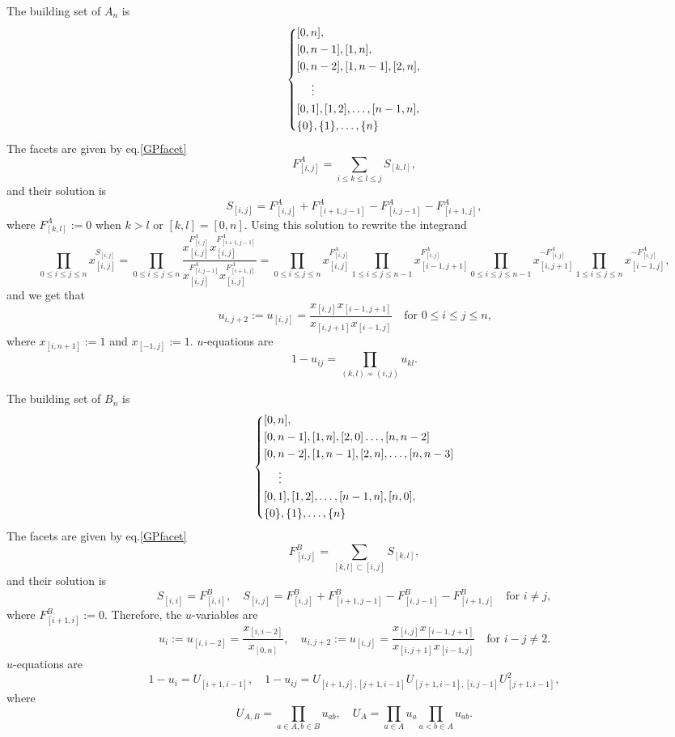 \documentclass[hidelinks,12pt]{article}
\begin{document}
The building set of $A_n$ is
\[\left\{
\begin{aligned}
	&[0,n],\\
	&[0,n-1],[1,n],\\
	&[0,n-2],[1,n-1],[2,n],\\
	&\hspace{3ex}\vdots\\
	&[0,1],[1,2],\dots,[n-1,n],\\
	&\{0\},\{1\},\dots,\{n\}
\end{aligned}\right.
\]
The facets are given by eq.\eqref{GPfacet}
\[
F^A_{[i,j]}=\sum_{i\leq k\leq l\leq j}S_{[k,l]},
\]
and their solution is 
\[
S_{[i,j]}=F^A_{[i,j]}+F^A_{[i+1,j-1]}-F^A_{[i,j-1]}-F^A_{[i+1,j]},
\]
where $F^A_{[k,l]}:=0$ when $k>l$ or $[k,l]=[0,n]$. Using this solution to rewrite the integrand
\[
\prod_{0\leq i\leq j\leq n}x_{[i,j]}^{S_{[i,j]}}
=\prod_{0\leq i\leq j\leq n}\frac{x_{[i,j]}^{F^A_{[i,j]}}x_{[i,j]}^{F^A_{[i+1,j-1]}}}{x_{[i,j]}^{F^A_{[i,j-1]}}x_{[i,j]}^{F^A_{[i+1,j]}}}
=
\prod_{0\leq i\leq j\leq n}x_{[i,j]}^{F^A_{[i,j]}}
\prod_{1\leq i\leq j\leq n-1}x_{[i-1,j+1]}^{F^A_{[i,j]}}
\prod_{0\leq i\leq j\leq n-1}x_{[i,j+1]}^{-F^A_{[i,j]}}
\prod_{1\leq i\leq j\leq n}x_{[i-1,j]}^{-F^A_{[i,j]}},
\]
and we get that
\[
u_{i,j+2}:=u_{[i,j]}=\frac{x_{[i,j]}x_{[i-1,j+1]}}{x_{[i,j+1]}x_{[i-1,j]}} \quad \text{for $0\leq i\leq j\leq n$,}
\]
where $x_{[i,n+1]}:=1$ and  $x_{[-1,j]}:=1$. $u$-equations are
\[
1-u_{ij}=\prod_{(k,l)\not\sim (i,j)}u_{kl}.
\]

The building set of $B_n$ is
\[\left\{
\begin{aligned}
	&[0,n],\\
	&[0,n-1],[1,n],[2,0]\dots,[n,n-2]\\
	&[0,n-2],[1,n-1],[2,n],\dots,[n,n-3]\\
	&\hspace{3ex}\vdots\\
	&[0,1],[1,2],\dots,[n-1,n],[n,0],\\
	&\{0\},\{1\},\dots,\{n\}
\end{aligned}\right.
\]
The facets are given by eq.\eqref{GPfacet}
\[
F^B_{[i,j]}=\sum_{[k,l]\subset [i,j]}S_{[k,l]},
\]
and their solution is 
\[
S_{[i,i]}=F^B_{[i,i]},\quad S_{[i,j]}=F^B_{[i,j]}+F^B_{[i+1,j-1]}-F^B_{[i,j-1]}-F^B_{[i+1,j]}\quad \text{for $i\neq j$},
\]
where $F^B_{[i+1,i]}:=0$. Therefore, the $u$-variables are
\[
u_i:=u_{[i,i-2]}=\frac{x_{[i,i-2]}}{x_{[0,n]}},\quad 
u_{i,j+2}:=u_{[i,j]}=\frac{x_{[i,j]}x_{[i-1,j+1]}}{x_{[i,j+1]}x_{[i-1,j]}}
\quad \text{for $i-j\neq 2$}.
\]
$u$-equations are
\[
1-u_i=U_{[i+1,i-1]},\quad 
1-u_{ij}=U_{[i+1,j],[j+1,i-1]}U_{[j+1,i-1],[i,j-1]}U^2_{[j+1,i-1]},
\]
where 
\[
U_{A,B}=\prod_{a\in A,b\in B}u_{ab},\quad 
U_A=\prod_{a\in A}u_a\prod_{a<b\in A}u_{ab}.
\]
\end{document}
